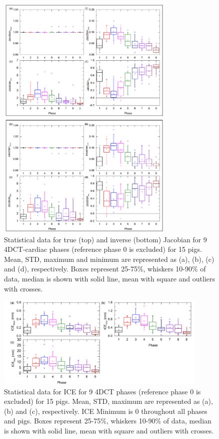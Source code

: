 \documentclass[type=dr, dr=rernat, accentcolor=tud7b,colorbacktitle, bigchapter, openright, twoside, 12pt ]{tudthesis}
\begin{document}
\newpage

\begin{figure}[H]
	\begin{center}		
		\includegraphics[width=0.75\textwidth]{./Images/Jacobian_data_pigs.png}
		\caption{Statistical data for true (top) and inverse (bottom) Jacobian for 9 4DCT-cardiac phases (reference phase 0 is excluded) for 15 pigs. Mean, STD, maximum and minimum are represented as (a), (b), (c) and (d), respectively.
		Boxes represent 25-75\%, whiskers 10-90\% of data, median is shown with solid line, mean with square and outliers with crosses.}
		\label{jacobian_data_pigs}
	\end{center}
\end{figure}

\newpage

\begin{figure}[H]
	\begin{center}		
		\includegraphics[width=0.9\textwidth]{./Images/ICE_pigs.png}
		\caption{Statistical data for ICE for 9 4DCT phases (reference phase 0 is excluded) for 15 pigs. Mean, STD, maximum are represented as (a), (b) and (c), respectively. ICE Minimum is 0 throughout all phases and pigs.
		Boxes represent 25-75\%, whiskers 10-90\% of data, median is shown with solid line, mean with square and outliers with crosses.}
		\label{ice_pigs}
	\end{center}
\end{figure}
\end{document}
